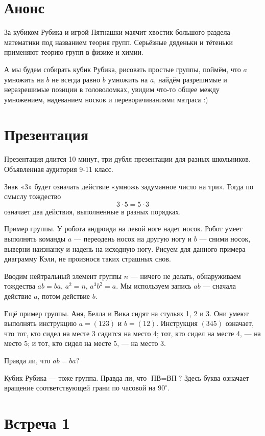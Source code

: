 \documentclass[a4paper, 12pt]{article}
\begin{document}
\section{Анонс}

За кубиком Рубика и игрой Пятнашки маячит хвостик большого раздела математики под названием теория групп. Серьёзные дяденьки и тётеньки применяют теорию групп в физике и химии. 

А мы будем собирать кубик Рубика, рисовать простые группы, поймём, что $a$ умножить на $b$ не всегда равно $b$ умножить на $a$, найдём разрешимые и неразрешимые позиции в головоломках, увидим что-то общее между умножением, надеванием носков и переворачиваниями матраса :)

\section{Презентация}

Презентация длится 10 минут, три дубля презентации для разных школьников. 
Объявленная аудитория 9-11 класс.

Знак «3» будет означать действие «умножь задуманное число на три». Тогда по смыслу тождество
\[
3 \cdot 5 = 5 \cdot 3
\]
означает два действия, выполненные в разных порядках.

Пример группы. У робота андроида на левой ноге надет носок. Робот умеет выполнять команды $a$ — переодень носок на другую ногу и $b$ — сними носок, выверни наизнанку и надень на исходную ногу. Рисуем для данного примера диаграмму Кэли, не произнося таких страшных снов.

Вводим нейтральный элемент группы $n$ — ничего не делать, обнаруживаем тождества $ab=ba$, $a^2=n$, $a^3b^2=a$. Мы используем запись $ab$ — сначала действие $a$, потом действие $b$.

Ещё пример группы. Аня, Белла и Вика сидят на стульях 1, 2 и 3. Они умеют выполнять инструкцию $a=(123)$ и $b=(12)$. Инструкция $(345)$ означает, что тот, кто сидел на месте 3 садится на место 4; тот, кто сидел на месте 4, — на место 5; и тот, кто сидел на месте 5, — на место 3.

Правда ли, что $ab=ba$?

Кубик Рубика — тоже группа. Правда ли, что $\text{П}\text{В}=\text{В}\text{П}$? Здесь буква означает вращение соответствующей грани по часовой на $90^{\circ}$.

\section{Встреча 1}
\end{document}

